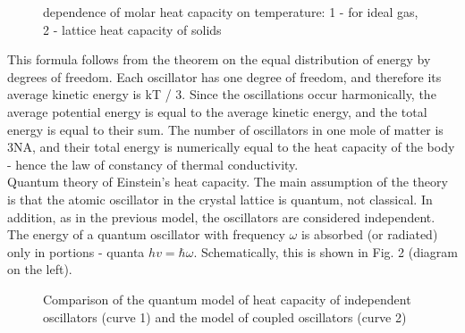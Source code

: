 \documentclass[a4paper,14pt]{extreport}
\begin{document}
\begin{figure}[h]
\caption{dependence of molar heat capacity on temperature: 1 - for ideal gas, 2 - lattice heat capacity of solids}
\label{ris1}
\end{figure}

This formula follows from the theorem on the equal distribution of energy by degrees of freedom. Each oscillator has one degree of freedom, and therefore its average kinetic energy is kT / 3. Since the oscillations occur harmonically, the average potential energy is equal to the average kinetic energy, and the total energy is equal to their sum. The number of oscillators in one mole of matter is 3NA, and their total energy is numerically equal to the heat capacity of the body - hence the law of constancy of thermal conductivity. \\

Quantum theory of Einstein's heat capacity. The main assumption of the theory is that the atomic oscillator in the crystal lattice is quantum, not classical. In addition, as in the previous model, the oscillators are considered independent.
The energy of a quantum oscillator with frequency $ \omega $ is absorbed (or radiated) only in portions - quanta $ hv = \hbar \omega $. Schematically, this is shown in Fig. 2 (diagram on the left).


\begin{figure}[h]
\caption{Comparison of the quantum model of heat capacity of independent oscillators (curve 1) and the model of coupled oscillators (curve 2)}
\label{ris1}
\end{figure}
\end{document}
